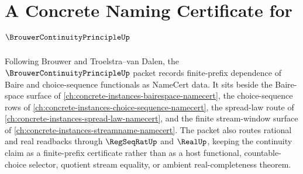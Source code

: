 \chapter{A Concrete Naming Certificate for $\BrouwerContinuityPrincipleUp$}
\label{ch:concrete-instances-brouwer-continuity-principle-namecert}

Following Brouwer and Troelstra--van Dalen, the $\BrouwerContinuityPrincipleUp$ packet records finite-prefix dependence of Baire and choice-sequence functionals as NameCert data. It sits beside the Baire-space surface of \autoref{ch:concrete-instances-bairespace-namecert}, the choice-sequence rows of \autoref{ch:concrete-instances-choice-sequence-namecert}, the spread-law route of \autoref{ch:concrete-instances-spread-law-namecert}, and the finite stream-window surface of \autoref{ch:concrete-instances-streamname-namecert}. The packet also routes rational and real readbacks through $\RegSeqRatUp$ and $\RealUp$, keeping the continuity claim as a finite-prefix certificate rather than as a host functional, countable-choice selector, quotient stream equality, or ambient real-completeness theorem.

